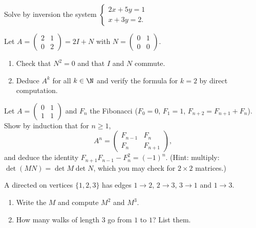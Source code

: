 \begin{exercise}[$\star$]\label{exo:g12:matrix:3}
Solve by  inversion the system
$\begin{cases} 2x + 5y = 1\\ x + 3y = 2 . \end{cases}$
\end{exercise}

\begin{exercise}[$\star\star$]\label{exo:g12:matrix:4}
Let $A = \begin{pmatrix} 2 & 1\\ 0 & 2\end{pmatrix} = 2I + N$ with
$N = \begin{pmatrix} 0 & 1\\ 0 & 0 \end{pmatrix}$.
\begin{enumerate}
  \item Check that $N^2 = 0$ and that $I$ and $N$ commute.
  \item Deduce $A^k$ for all $k \in \N$ and verify the formula for $k=2$ by
        direct computation.
\end{enumerate}
\end{exercise}

\begin{exercise}[$\star\star$]\label{exo:g12:matrix:5}
Let $A = \begin{pmatrix} 0 & 1\\ 1 & 1\end{pmatrix}$ and $F_n$ the Fibonacci
 ($F_0 = 0$, $F_1 = 1$, $F_{n+2} = F_{n+1} + F_n$). Show by
induction that for $n \geq 1$,
\[
A^n = \begin{pmatrix} F_{n-1} & F_n\\ F_n & F_{n+1}\end{pmatrix},
\]
and deduce the identity $F_{n+1}F_{n-1} - F_n^2 = (-1)^n$.
(Hint:  multiply: $\det(MN) = \det M \det N$, which you may
check for $2\times2$ matrices.)
\end{exercise}

\begin{exercise}[$\star\star$]\label{exo:g12:matrix:6}
A directed  on vertices $\{1, 2, 3\}$ has edges
$1\to2$, $2\to3$, $3\to1$ and $1\to3$.
\begin{enumerate}
  \item Write the  $M$ and compute $M^2$ and $M^3$.
  \item How many walks of length $3$ go from $1$ to $1$? List them.
\end{enumerate}
\end{exercise}

